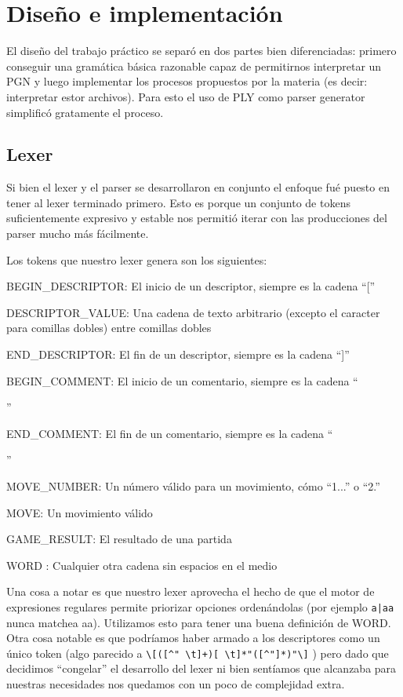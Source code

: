 \section{Diseño e implementación}

El diseño del trabajo práctico se separó en dos partes bien diferenciadas: primero conseguir una gramática básica razonable capaz de permitirnos interpretar un PGN y luego implementar los procesos propuestos por la materia (es decir: interpretar estor archivos). Para esto el uso de PLY como parser generator simplificó gratamente el proceso.

\subsection{Lexer}

Si bien el lexer y el parser se desarrollaron en conjunto el enfoque fué puesto en tener al lexer terminado primero. Esto es porque un conjunto de tokens suficientemente expresivo y estable nos permitió iterar con las producciones del parser mucho más fácilmente.

Los tokens que nuestro lexer genera son los siguientes:
\begin{itemize}
    \item BEGIN\_DESCRIPTOR: El inicio de un descriptor, siempre es la cadena ``[''
    \item DESCRIPTOR\_VALUE: Una cadena de texto arbitrario (excepto el caracter para comillas dobles) entre comillas dobles
    \item END\_DESCRIPTOR: El fin de un descriptor, siempre es la cadena ``]''
    \item BEGIN\_COMMENT: El inicio de un comentario, siempre es la cadena ``{''
    \item END\_COMMENT: El fin de un comentario, siempre es la cadena ``}''
    \item MOVE\_NUMBER: Un número válido para un movimiento, cómo ``1...'' o ``2.''
    \item MOVE: Un movimiento válido
    \item GAME\_RESULT: El resultado de una partida
    \item WORD : Cualquier otra cadena sin espacios en el medio
\end{itemize}
    
    
Una cosa a notar es que nuestro lexer aprovecha el hecho de que el motor de expresiones regulares permite priorizar opciones ordenándolas (por ejemplo \verb/a|aa/ nunca matchea aa). Utilizamos esto para tener una buena definición de WORD. Otra cosa notable es que podríamos haber armado a los descriptores como un único token (algo parecido a \verb/\[([^" \t]+)[ \t]*"([^"]*)"\]/ )  pero dado que decidimos ``congelar'' el desarrollo del lexer ni bien sentíamos que alcanzaba para nuestras necesidades nos quedamos con un poco de complejidad extra.

